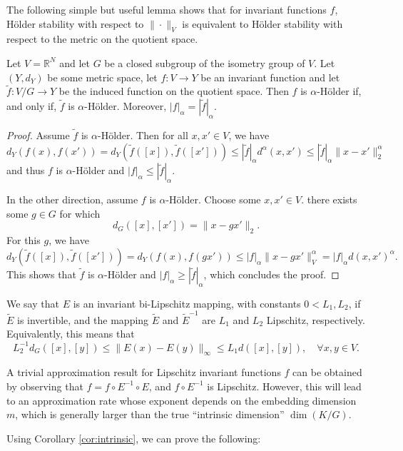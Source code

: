 \documentclass[twoside,11pt]{article}
\newcommand{\RR}{\mathbb{R}}
\begin{document}
The following simple but useful lemma shows that for invariant functions $f$, H\"older stability with respect to $\|\cdot \|_V $ is equivalent to H\"older stability with respect to the metric on the quotient space. 
\begin{lem}\label{lem:holder}
Let $V=\RR^N$ and let $G$ be a closed subgroup of the isometry group of $V$. Let $(Y,d_Y)$ be some metric space,  let $f:V\to Y $ be an invariant function and let $\tilde f:V/G\to Y$ be the induced function on the quotient space. Then $f$ is $\alpha$-H\"older if, and only if, $\tilde f$ is $\alpha$-H\"older. Moreover, $|f|_\alpha=|\tilde f|_\alpha $.
\end{lem}
\begin{proof}
Assume $\tilde f$ is $\alpha$-H\"older. Then for all $x,x'\in V$, we have 
$$d_Y(f(x),f(x'))=d_Y(\tilde f([x]),\tilde f([x']))\leq |\tilde f|_\alpha d^{\alpha}(x,x')\leq |\tilde f|_\alpha \|x-x'\|_2^\alpha $$
and thus $f$ is $\alpha$-H\"older and $|f|_\alpha \leq |\tilde f|_\alpha  $.


In the other direction, assume $f$ is $\alpha$-H\"older. Choose some $x,x'\in V$. there exists some $g\in G$ for which 
$$d_G([x],[x'])=\|x-gx'\|_2 .$$
For this $g$, we have 
$$d_Y(\tilde f([x]),\tilde f([x']))=d_Y(f(x),f(gx'))\leq |f|_\alpha \|x-gx'\|_V^\alpha=|f|_\alpha d(x,x')^\alpha. $$
This shows that $\tilde f $ is $\alpha$-H\"older and $|f|_\alpha \geq |\tilde f|_\alpha  $, which  concludes the proof.
\end{proof}
We say that $E$ 
is an invariant bi-Lipschitz mapping, with constants $0<L_1,L_2$, if  $\tilde E$ is invertible, and the mapping $\tilde E$ and $\tilde E^{-1}$ are $L_1$ and $L_2$ Lipschitz, respectively. Equivalently, this means that
$$L_2^{-1} d_G([x],[y])\leq \|E(x)-E(y)\|_\infty\leq L_1 d([x],[y]), \quad \forall x,y\in V. $$







A trivial approximation result for Lipschitz invariant functions $f$ can be obtained by observing that $f=f\circ E^{-1}\circ E$, and $f\circ E^{-1} $ is Lipschitz. However, this will lead to an approximation rate whose exponent depends on the embedding dimension $m$, which is generally larger than the true ``intrinsic dimension'' $\dim(K/G)$. 


Using Corollary \ref{cor:intrinsic}, we can prove the following:
\end{document}
